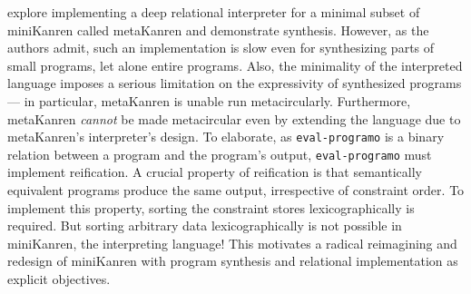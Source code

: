 \citet{joshi2021metakanren} explore implementing a deep relational interpreter
for a minimal subset of miniKanren called metaKanren and demonstrate synthesis.
However, as the authors admit, such an implementation is slow even for
synthesizing parts of small programs, let alone entire programs. Also, the
minimality of the interpreted language imposes a serious limitation on the
expressivity of synthesized programs --- in particular, metaKanren is unable run
metacircularly. Furthermore, metaKanren \textit{cannot} be made metacircular
even by extending the language due to metaKanren's interpreter's design. To
elaborate, as \Verb|eval-programo| is a binary relation between a program and
the program's output, \Verb|eval-programo| must implement reification. A crucial
property of reification is that semantically equivalent programs produce the
same output, irrespective of constraint order. To implement this property,
sorting the constraint stores lexicographically is required. But sorting
arbitrary data lexicographically is not possible in miniKanren, the interpreting
language! This motivates a radical reimagining and redesign of miniKanren with
program synthesis and relational implementation as explicit objectives.
